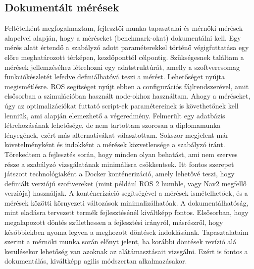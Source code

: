 \subsection{Dokumentált mérések}
Feltételként megfogalmaztam, fejlesztői munka tapasztalai és mérnöki mérések alapelvei alapján, hogy a méréseket (benchmark-okat) dokumentálni kell. Egy mérés alatt értendő a szabályzó adott paraméterekkel történő végigfuttatása egy előre meghatározott térképen, kezdőponttól célpontig. Szükségesnek találtam a mérések jellemzéséhez létrehozni egy adatstruktúrát, amelly a szoftvercsomag funkciókészletét lefedve definiálhatóvá teszi a mérést. Lehetőséget nyújta megismétlésre. ROS segítséget nyújt ebben a configurációs fájlrendszerével, amit elsősorban a szimulációban használt node-okhoz használtam. Ahogy a méréseket, úgy az optimalizációkat futtató script-ek paramétereinek is követhetőnek kell lenniük, ami alapján elemezhető a végeredmény. Felmerült egy adatbázis létrehozásának lehetősége, de nem tartottam szorosan a diplomamunka lényegének, ezért más alternatívákat választottam. Sokszor megjelent már követelményként és indokként a mérések közvetlensége a szabályzó iránt. Törekedtem a fejlesztés során, hogy minden olyan behatást, ami nem szerves része a szabályzó vizsgálatának minimálisra csökkentsek. Itt fontos szerepet játszott technológiaként a Docker konténerizáció, amely lehetővé teszi, hogy definiált verziójú szoftvereket (mint például ROS 2 humble, vagy Nav2 megfellő verziója) használjak. A konténerizáció segítségével a mérések ismételhetőek, és a mérések közötti környezeti változások minimalizálhatóak. A dokumentálhatóság, mint eladásra tervezett termék fejlesztésénél kiváltképp fontos. Elsősorban, hogy megalapozott döntés születhessen a fejlesztési irányról, másrészről, hogy későbbiekben nyoma legyen a meghozott döntések indoklásának. Tapasztalataim szerint a mérnöki munka során előnyt jelent, ha korábbi döntések revízió alá kerülésekor lehetőség van azoknak az alátámasztásait vizsgálni. Ezért is fontos a dokumentálás, kiváltképp agilis módszertan alkalmazásakor.

